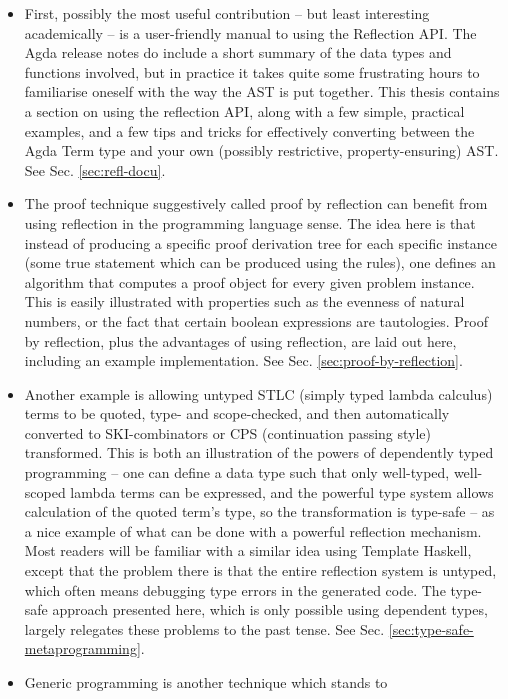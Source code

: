 \begin{itemize}
  \item First, possibly the most useful contribution -- but least
interesting academically -- is a user-friendly manual to using the
Reflection API. The Agda release notes\cite{agda-relnotes-228} do
include a short summary of the data types and functions involved, but
in practice it takes quite some frustrating hours to familiarise
oneself with the way the AST is put together. This thesis contains a
section on using the reflection API, along with a few simple,
practical examples, and a few tips and tricks for effectively
converting between the Agda Term type and your own (possibly
restrictive, property-ensuring) AST. See Sec. \ref{sec:refl-docu}.
  \item The proof technique suggestively called proof by reflection
can benefit from using reflection in the programming language
sense. The idea here is that instead of producing a specific proof
derivation tree for each specific instance (some true statement which
can be produced using the rules), one defines an algorithm that computes a proof object for every given problem instance. This is easily illustrated
with properties such as the evenness of natural numbers, or the fact
that certain boolean expressions are tautologies. Proof by reflection,
plus the advantages of using reflection, are laid out here, including
an example implementation. See Sec. \ref{sec:proof-by-reflection}.
  \item Another example is allowing untyped STLC (simply typed lambda
calculus) terms to be quoted, type- and scope-checked, and then
automatically converted to SKI-combinators or CPS (continuation
passing style) transformed. This is both an illustration of the powers of
dependently typed programming -- one can define a data type such
that only well-typed, well-scoped lambda terms can be expressed, and the
powerful type system allows calculation of the quoted term's type, so the transformation
is type-safe -- as a
nice example of what can be done with a powerful reflection mechanism. Most
readers will be familiar with a similar idea using Template Haskell, except that
the problem there is that the entire reflection system is untyped, which often
means debugging type errors in the generated code. The type-safe approach presented
here, which is only possible using dependent types, largely relegates these problems
to the past tense. See Sec. \ref{sec:type-safe-metaprogramming}.
  \item Generic programming is another technique which stands to

\end{itemize}
